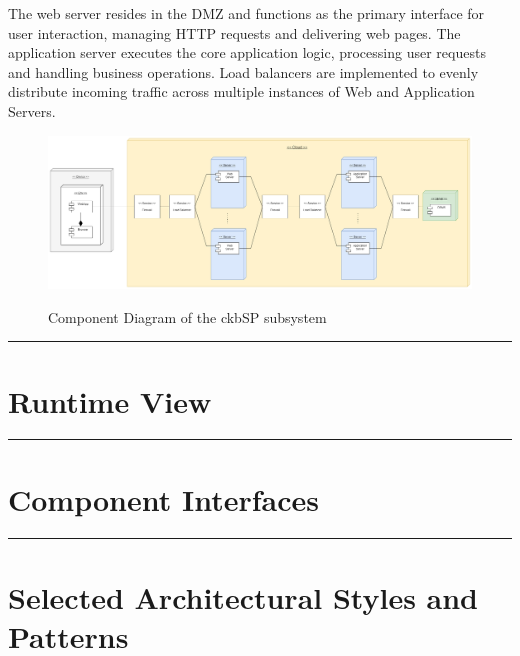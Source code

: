 \documentclass{Configuration_Files/Template}
\begin{document}
The web server resides in the DMZ and functions as the primary interface for user interaction, managing HTTP requests and delivering web pages. The application server executes the core application logic, processing user requests and handling business operations. Load balancers are implemented to evenly distribute incoming traffic across multiple instances of Web and Application Servers.

\begin{figure}[H]
\centering
\includegraphics[scale = 0.4]{DD_latex/Images/diagrams/Deployment_view.png}\\
\caption{Component Diagram of the ckbSP subsystem}
\end{figure}

{\color{bluepoli}\rule{\linewidth}{0.1pt}}

\section{Runtime View}

{\color{bluepoli}\rule{\linewidth}{0.1pt}}

\section{Component Interfaces}

{\color{bluepoli}\rule{\linewidth}{0.1pt}}

\section{Selected Architectural Styles and Patterns}
\end{document}
